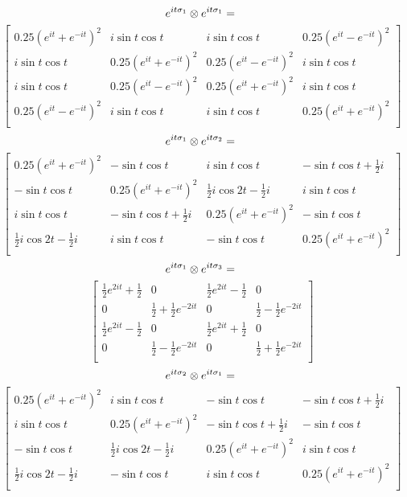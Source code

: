 \documentclass{article}
\begin{document}
\[ e^{it\sigma_1} \otimes e^{it\sigma_1} = \\ \] \[ \left[
    \begin{array}{cccc}
    0.25(e^{it} + e^{-it})^2 & i\sin{t}\cos{t} & i\sin{t}\cos{t} & 0.25(e^{it} - e^{-it})^2 \\
    i\sin{t}\cos{t} & 0.25(e^{it} + e^{-it})^2 & 0.25(e^{it} - e^{-it})^2 & i\sin{t}\cos{t} \\
    i\sin{t}\cos{t} & 0.25(e^{it} - e^{-it})^2 & 0.25(e^{it} + e^{-it})^2 & i\sin{t}\cos{t} \\
    0.25(e^{it} - e^{-it})^2 & i\sin{t}\cos{t} & i\sin{t}\cos{t} & 0.25(e^{it} + e^{-it})^2 \\
    \end{array}
    \right]  \]
\[ e^{it\sigma_1} \otimes e^{it\sigma_2} = \\ \] \[ \left[
    \begin{array}{cccc}
    0.25(e^{it} + e^{-it})^2 & -\sin{t}\cos{t} & i\sin{t}\cos{t} & -\sin{t}\cos{t} + \frac{1}{2}i \\
    -\sin{t}\cos{t} & 0.25(e^{it} + e^{-it})^2 & \frac{1}{2}i\cos{2t} - \frac{1}{2}i & i\sin{t}\cos{t} \\
    i\sin{t}\cos{t} & -\sin{t}\cos{t} + \frac{1}{2}i & 0.25(e^{it} + e^{-it})^2 & -\sin{t}\cos{t} \\
    \frac{1}{2}i\cos{2t} - \frac{1}{2}i & i\sin{t}\cos{t} & -\sin{t}\cos{t} & 0.25(e^{it} + e^{-it})^2 \\
    \end{array}
    \right] \]
\[ e^{it\sigma_1} \otimes e^{it\sigma_3} = \\ \] \[\left[
    \begin{array}{cccc}
    \frac{1}{2}e^{2it} + \frac{1}{2} & 0 & \frac{1}{2}e^{2it} - \frac{1}{2} & 0 \\
    0 & \frac{1}{2} + \frac{1}{2}e^{-2it} & 0 & \frac{1}{2} - \frac{1}{2}e^{-2it} \\
    \frac{1}{2}e^{2it} - \frac{1}{2} & 0 & \frac{1}{2}e^{2it} + \frac{1}{2} & 0 \\
    0 & \frac{1}{2} - \frac{1}{2}e^{-2it} & 0 & \frac{1}{2} + \frac{1}{2}e^{-2it} \\
    \end{array}
    \right] \]
\[ e^{it\sigma_2} \otimes e^{it\sigma_1} = \\ \] \[  \left[
    \begin{array}{cccc}
    0.25(e^{it} + e^{-it})^2 & i\sin{t}\cos{t} & -\sin{t}\cos{t} & -\sin{t}\cos{t} + \frac{1}{2}i \\
    i\sin{t}\cos{t} & 0.25(e^{it} + e^{-it})^2 & -\sin{t}\cos{t} + \frac{1}{2}i & -\sin{t}\cos{t} \\
    -\sin{t}\cos{t} & \frac{1}{2}i\cos{2t} - \frac{1}{2}i & 0.25(e^{it} + e^{-it})^2 & i\sin{t}\cos{t} \\
    \frac{1}{2}i\cos{2t} - \frac{1}{2}i & -\sin{t}\cos{t} & i\sin{t}\cos{t} & 0.25(e^{it} + e^{-it})^2 \\
    \end{array}
    \right]  \]
\end{document}
